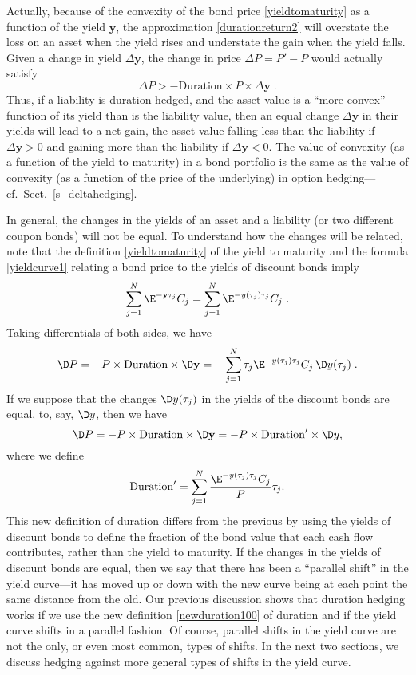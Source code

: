 Actually, because of the convexity  of the bond price \eqref{yieldtomaturity} as a function of the yield $\mathbf{y}$, the approximation \eqref{durationreturn2} will overstate the loss on an asset when the yield rises and understate the gain when the yield falls.  Given a change in yield $\varDelta \mathbf{y}$, the change in price $\varDelta P = P'-P$ would actually satisfy
$$\varDelta P > -  \text{Duration} \times P \times \varDelta \mathbf{y}\; .$$
Thus, if a liability is duration hedged, and the asset value is a ``more convex'' function of its yield than is the liability value, then an equal change $\varDelta \mathbf{y}$ in their yields will lead to a net gain, the asset value falling less than the liability if $\varDelta \mathbf{y} >0$ and gaining more than the liability if $\varDelta \mathbf{y}<0$.  The value of convexity (as a function of the yield to maturity) in a bond portfolio is the same as the value of convexity (as a function of the price of the underlying) in option hedging---cf.~Sect.~\ref{s_deltahedging}.

In general, the changes in the yields of an asset and a liability (or two different coupon bonds) will not be equal.  To understand how the changes will be related, note that the definition \eqref{yieldtomaturity} of the yield to maturity and the formula \eqref{yieldcurve1} relating a bond price to the yields of discount bonds imply
$$\sum_{j=1}^N \E^{-\mathbf{y}\tau_j}C_j =  \sum_{j=1}^{N} \E^{-y(\tau_{j})\tau_{j}}C_{j}\; .$$
Taking differentials of both sides, we have
$$\D P = -P \times \text{Duration} \times \D \mathbf{y} = -\sum_{j=1}^{N} \tau_j \E^{-y(\tau_{j})\tau_{j}}C_{j}\,\D y(\tau_j)\; .$$
If we suppose that the changes $\D y(\tau_j)$ in the yields of the discount bonds are equal, to, say, $\D y$, then we have
$$\D P = -P \times \text{Duration} \times \D \mathbf{y} = -P \times \text{Duration}' \times \D y,$$
where we define
\begin{equation}\label{newduration100}
\text{Duration}' = \sum_{j=1}^N \frac{\E^{-y(\tau_j)\tau_j}C_j}{P}\tau_j.
\end{equation}
This new definition of duration differs from the previous by using the yields of discount bonds to define the fraction of the bond value that each cash flow contributes, rather than the yield to maturity.  If the changes in the yields of discount bonds are equal, then we say that there has been a ``parallel shift'' in the yield curve---it has moved up or down with the new curve being at each point the same distance from the old.  Our previous discussion shows that duration hedging works if we use the new definition \eqref{newduration100} of duration and if the yield curve shifts in a parallel fashion.  Of course, parallel shifts in the yield curve are not the only, or even most common, types of shifts.  In the next two sections, we discuss hedging against more general types of shifts in the yield curve.

